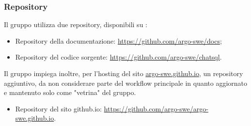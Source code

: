 \subsubsection{Repository}
Il gruppo utilizza due repository, disponibili su :
\begin{itemize}
  \item Repository della documentazione: \href{https://github.com/argo-swe/docs}{https://github.com/argo-swe/docs};
  \item Repository del codice sorgente: \href{https://github.com/argo-swe/chatsql}{https://github.com/argo-swe/chatsql}.
\end{itemize}
Il gruppo impiega inoltre, per l'hosting del sito \href{https://argo-swe.github.io}{argo-swe.github.io}, un repository aggiuntivo, da non considerare parte del workflow principale in quanto aggiornato e mantenuto solo come "vetrina" del gruppo.
\begin{itemize}
  \item Repository del sito github.io: \href{https://github.com/argo-swe/argo-swe.github.io}{https://github.com/argo-swe/argo-swe.github.io}.
\end{itemize}

